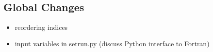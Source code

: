 %
%
%

\subsection{Global Changes}
\begin{itemize}
    \item reordering indices
    \item input variables in setrun.py (discuss Python interface to Fortran)
\end{itemize}